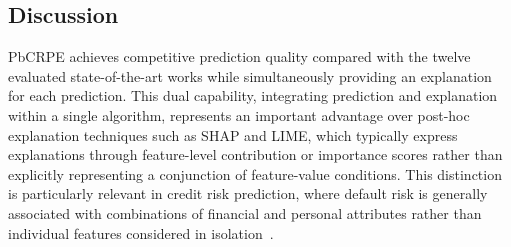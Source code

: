 {%



\subsection{Discussion}

PbCRPE achieves competitive prediction quality compared with the twelve evaluated state-of-the-art works while simultaneously providing an explanation for each prediction. This dual capability, integrating prediction and explanation within a single algorithm, represents an important advantage over post-hoc explanation techniques such as SHAP and LIME, which typically express explanations through feature-level contribution or importance scores rather than explicitly representing a conjunction of feature-value conditions. This distinction is particularly relevant in credit risk prediction, where default risk is generally associated with combinations of financial and personal attributes rather than individual features considered in isolation~\cite{aruleba2025improved}.\newline

}
